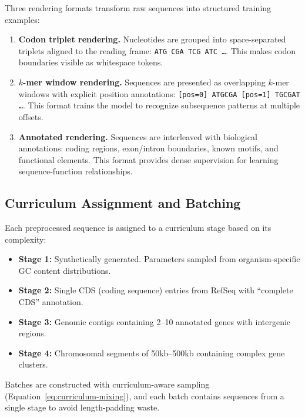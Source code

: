 \begin{dogmadef}
Three rendering formats transform raw sequences into structured training examples:
\begin{enumerate}[leftmargin=1.5em]
  \item \textbf{Codon triplet rendering.} Nucleotides are grouped into space-separated triplets aligned to the reading frame: \texttt{ATG CGA TCG ATC \ldots}. This makes codon boundaries visible as whitespace tokens.

  \item \textbf{$k$-mer window rendering.} Sequences are presented as overlapping $k$-mer windows with explicit position annotations: \texttt{[pos=0] ATGCGA [pos=1] TGCGAT \ldots}. This format trains the model to recognize subsequence patterns at multiple offsets.

  \item \textbf{Annotated rendering.} Sequences are interleaved with biological annotations: coding regions, exon/intron boundaries, known motifs, and functional elements. This format provides dense supervision for learning sequence-function relationships.
\end{enumerate}
\end{dogmadef}

\subsection{Curriculum Assignment and Batching}

Each preprocessed sequence is assigned to a curriculum stage based on its complexity:

\begin{itemize}[leftmargin=1.5em]
  \item \textbf{Stage 1:} Synthetically generated. Parameters sampled from organism-specific GC content distributions.
  \item \textbf{Stage 2:} Single CDS (coding sequence) entries from RefSeq with ``complete CDS'' annotation.
  \item \textbf{Stage 3:} Genomic contigs containing 2--10 annotated genes with intergenic regions.
  \item \textbf{Stage 4:} Chromosomal segments of 50kb--500kb containing complex gene clusters.
\end{itemize}

Batches are constructed with curriculum-aware sampling (Equation~\ref{eq:curriculum-mixing}), and each batch contains sequences from a single stage to avoid length-padding waste.

